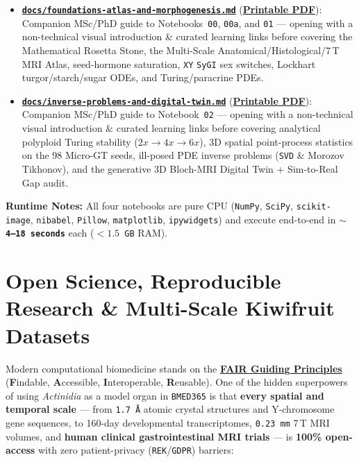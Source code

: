 \documentclass[10pt,a4paper]{article}
\newcommand{\ghblob}{https://github.com/arvidl/BMED365-2027/blob/main}
\begin{document}
\begin{infobox}
\begin{itemize}
    \item \href{\ghblob/Lab5-Comp-Mod/Kiwi-challenge/docs/foundations-atlas-and-morphogenesis.md}{\textbf{\texttt{docs/foundations-atlas-and-morphogenesis.md}}} (\href{\ghblob/Lab5-Comp-Mod/Kiwi-challenge/docs/foundations-atlas-and-morphogenesis.pdf}{\textbf{Printable PDF}}): Companion MSc/PhD guide to Notebooks~\texttt{00}, \texttt{00a}, and \texttt{01} --- opening with a non-technical visual introduction \& curated learning links before covering the Mathematical Rosetta Stone, the Multi-Scale Anatomical/Histological/7\,T MRI Atlas, seed-hormone saturation, \texttt{XY} \texttt{SyGI} sex switches, Lockhart turgor/starch/sugar ODEs, and Turing/paracrine PDEs.
    \item \href{\ghblob/Lab5-Comp-Mod/Kiwi-challenge/docs/inverse-problems-and-digital-twin.md}{\textbf{\texttt{docs/inverse-problems-and-digital-twin.md}}} (\href{\ghblob/Lab5-Comp-Mod/Kiwi-challenge/docs/inverse-problems-and-digital-twin.pdf}{\textbf{Printable PDF}}): Companion MSc/PhD guide to Notebook~\texttt{02} --- opening with a non-technical visual introduction \& curated learning links before covering analytical polyploid Turing stability ($2x \to 4x \to 6x$), 3D spatial point-process statistics on the 98 Micro-GT seeds, ill-posed PDE inverse problems (\texttt{SVD} \& Morozov Tikhonov), and the generative 3D Bloch-MRI Digital Twin + Sim-to-Real Gap audit.
\end{itemize}
\vspace{2pt}
\textbf{Runtime Notes:} All four notebooks are pure CPU (\texttt{NumPy}, \texttt{SciPy}, \texttt{scikit-image}, \texttt{nibabel}, \texttt{Pillow}, \texttt{matplotlib}, \texttt{ipywidgets}) and execute end-to-end in \textbf{\texttt{$\sim$4--18 seconds}} each (\texttt{$< 1.5$\,GB} RAM).
\end{infobox}

\section{Open Science, Reproducible Research \& Multi-Scale Kiwifruit Datasets}

Modern computational biomedicine stands on the \href{https://doi.org/10.1038/sdata.2016.18}{\textbf{FAIR Guiding Principles}} (\textbf{F}indable, \textbf{A}ccessible, \textbf{I}nteroperable, \textbf{R}eusable). One of the hidden superpowers of using \textit{Actinidia} as a model organ in \texttt{BMED365} is that \textbf{every spatial and temporal scale} --- from \texttt{1.7\,\AA} atomic crystal structures and Y-chromosome gene sequences, to 160-day developmental transcriptomes, \texttt{0.23\,mm} 7\,T MRI volumes, and \textbf{human clinical gastrointestinal MRI trials} --- is \textbf{100\% open-access} with zero patient-privacy (\texttt{REK}/\texttt{GDPR}) barriers:
\end{document}
